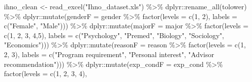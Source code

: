 \documentclass[
]{article}
\newenvironment{Shaded}{\begin{snugshade}}{\end{snugshade}}
\newcommand{\AttributeTok}[1]{\textcolor[rgb]{0.77,0.63,0.00}{#1}}
\newcommand{\DecValTok}[1]{\textcolor[rgb]{0.00,0.00,0.81}{#1}}
\newcommand{\FunctionTok}[1]{\textcolor[rgb]{0.00,0.00,0.00}{#1}}
\newcommand{\NormalTok}[1]{#1}
\newcommand{\OtherTok}[1]{\textcolor[rgb]{0.56,0.35,0.01}{#1}}
\newcommand{\SpecialCharTok}[1]{\textcolor[rgb]{0.00,0.00,0.00}{#1}}
\newcommand{\StringTok}[1]{\textcolor[rgb]{0.31,0.60,0.02}{#1}}
\begin{document}
\begin{Shaded}
\begin{Highlighting}[]
\NormalTok{ihno\_clean }\OtherTok{\textless{}{-}} \FunctionTok{read\_excel}\NormalTok{(}\StringTok{"Ihno\_dataset.xls"}\NormalTok{) }\SpecialCharTok{\%\textgreater{}\%} 
\NormalTok{  dplyr}\SpecialCharTok{::}\FunctionTok{rename\_all}\NormalTok{(tolower) }\SpecialCharTok{\%\textgreater{}\%} 
\NormalTok{  dplyr}\SpecialCharTok{::}\FunctionTok{mutate}\NormalTok{(}\AttributeTok{genderF =}\NormalTok{ gender }\SpecialCharTok{\%\textgreater{}\%} 
                  \FunctionTok{factor}\NormalTok{(}\AttributeTok{levels =} \FunctionTok{c}\NormalTok{(}\DecValTok{1}\NormalTok{, }\DecValTok{2}\NormalTok{),}
                         \AttributeTok{labels =} \FunctionTok{c}\NormalTok{(}\StringTok{"Female"}\NormalTok{, }
                                    \StringTok{"Male"}\NormalTok{))) }\SpecialCharTok{\%\textgreater{}\%} 
\NormalTok{  dplyr}\SpecialCharTok{::}\FunctionTok{mutate}\NormalTok{(}\AttributeTok{majorF =}\NormalTok{ major }\SpecialCharTok{\%\textgreater{}\%} 
                  \FunctionTok{factor}\NormalTok{(}\AttributeTok{levels =} \FunctionTok{c}\NormalTok{(}\DecValTok{1}\NormalTok{, }\DecValTok{2}\NormalTok{, }\DecValTok{3}\NormalTok{, }\DecValTok{4}\NormalTok{,}\DecValTok{5}\NormalTok{),}
                         \AttributeTok{labels =} \FunctionTok{c}\NormalTok{(}\StringTok{"Psychology"}\NormalTok{,}
                                    \StringTok{"Premed"}\NormalTok{,}
                                    \StringTok{"Biology"}\NormalTok{,}
                                    \StringTok{"Sociology"}\NormalTok{,}
                                    \StringTok{"Economics"}\NormalTok{))) }\SpecialCharTok{\%\textgreater{}\%} 
\NormalTok{  dplyr}\SpecialCharTok{::}\FunctionTok{mutate}\NormalTok{(}\AttributeTok{reasonF =}\NormalTok{ reason }\SpecialCharTok{\%\textgreater{}\%} 
                  \FunctionTok{factor}\NormalTok{(}\AttributeTok{levels =} \FunctionTok{c}\NormalTok{(}\DecValTok{1}\NormalTok{, }\DecValTok{2}\NormalTok{, }\DecValTok{3}\NormalTok{),}
                         \AttributeTok{labels =} \FunctionTok{c}\NormalTok{(}\StringTok{"Program requirement"}\NormalTok{,}
                                    \StringTok{"Personal interest"}\NormalTok{,}
                                    \StringTok{"Advisor recommendation"}\NormalTok{))) }\SpecialCharTok{\%\textgreater{}\%} 
\NormalTok{  dplyr}\SpecialCharTok{::}\FunctionTok{mutate}\NormalTok{(}\AttributeTok{exp\_condF =}\NormalTok{ exp\_cond }\SpecialCharTok{\%\textgreater{}\%} 
                  \FunctionTok{factor}\NormalTok{(}\AttributeTok{levels =} \FunctionTok{c}\NormalTok{(}\DecValTok{1}\NormalTok{, }\DecValTok{2}\NormalTok{, }\DecValTok{3}\NormalTok{, }\DecValTok{4}\NormalTok{),}

\end{Highlighting}
\end{Shaded}
\end{document}
